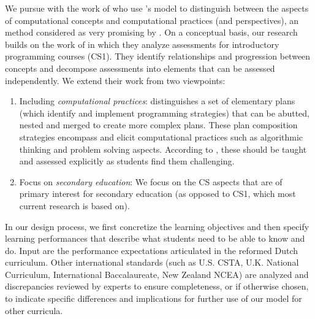 We pursue with the work of \cite{LyeKoh2014} who use \citeauthor{BrennanResnick2012}'s model to distinguish between the aspects of computational concepts and computational practices (and perspectives), an method considered as very promising by \cite{voogt2017effecten}. On a conceptual basis, our research builds on the work of  in which they analyze assessments for introductory programming courses (CS1). They identify relationships and progression between concepts and decompose assessments into elements that can be assessed independently. We extend their work from two viewpoints:
\begin{enumerate}
\item Including \emph{computational practices}:  distinguishes a set of elementary plans (which identify and implement programming strategies) that can be abutted, nested and merged to create more complex plans. These plan composition strategies encompass and elicit computational practices such as algorithmic thinking and problem solving aspects. According to \citeauthor{deRaadt2009teachingPlans}, these should be taught and assessed explicitly as students find them challenging.


\item Focus on \emph{secondary education}: We focus on the CS aspects that are of primary interest for secondary education (as opposed to CS1, which most current research is based on).

\end{enumerate}

In our design process, we first concretize the learning objectives and then specify learning performances that describe what students need to be able to know and do. Input are the performance expectations articulated in the reformed Dutch curriculum. Other international standards (such as U.S. CSTA, U.K. National Curriculum, International Baccalaureate, New Zealand NCEA) are analyzed and discrepancies reviewed by experts to ensure completeness, or if otherwise chosen, to indicate specific differences and implications for further use of our model for other curricula. 

